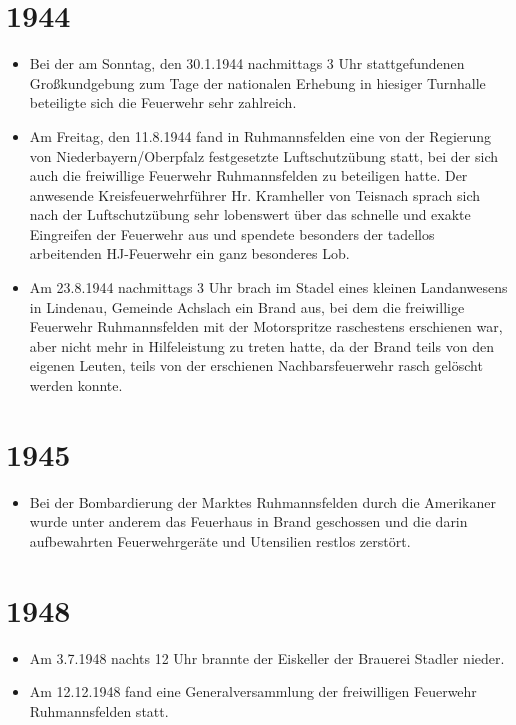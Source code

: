 \documentclass[12pt,a4paper]{book}
\begin{document}
\section*{1944}

\begin{itemize}
\item Bei der am Sonntag, den 30.1.1944 nachmittags 3 Uhr stattgefundenen
Großkundgebung zum Tage der nationalen Erhebung in hiesiger Turnhalle beteiligte
sich die Feuerwehr sehr zahlreich.

\item Am Freitag, den 11.8.1944 fand in Ruhmannsfelden eine von der Regierung
von Niederbayern/Oberpfalz festgesetzte Luftschutzübung statt, bei der sich auch
die freiwillige Feuerwehr Ruhmannsfelden zu beteiligen hatte. Der anwesende
Kreisfeuerwehrführer Hr. Kramheller von Teisnach sprach sich nach der
Luftschutzübung sehr lobenswert über das schnelle und exakte Eingreifen der
Feuerwehr aus und spendete besonders der tadellos arbeitenden HJ-Feuerwehr ein
ganz besonderes Lob.

\item Am 23.8.1944 nachmittags 3 Uhr brach im Stadel eines kleinen Landanwesens
in Lindenau, Gemeinde Achslach ein Brand aus, bei dem die freiwillige Feuerwehr
Ruhmannsfelden mit der Motorspritze raschestens erschienen war, aber nicht mehr
in Hilfeleistung zu treten hatte, da der Brand teils von den eigenen Leuten,
teils von der erschienen Nachbarsfeuerwehr rasch gelöscht werden konnte.
\end{itemize}

\section*{1945}

\begin{itemize}
\item Bei der Bombardierung der Marktes Ruhmannsfelden durch die Amerikaner
wurde unter anderem das Feuerhaus in Brand geschossen und die darin aufbewahrten
Feuerwehrgeräte und Utensilien restlos zerstört.
\end{itemize}

\section*{1948}

\begin{itemize}
\item Am 3.7.1948 nachts 12 Uhr brannte der Eiskeller der Brauerei Stadler
nieder.

\item Am 12.12.1948 fand eine Generalversammlung der freiwilligen Feuerwehr
Ruhmannsfelden statt.
\end{itemize}
\end{document}
